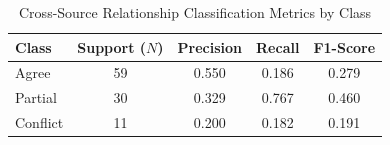 \begin{table}[htbp]
\centering
\caption{Cross-Source Relationship Classification Metrics by Class}
\label{tab:per_class_classification}
\begin{tabular}{lcccc}
\toprule
\textbf{Class} & \textbf{Support ($N$)} & \textbf{Precision} & \textbf{Recall} & \textbf{F1-Score} \\
\midrule
Agree & 59 & 0.550 & 0.186 & 0.279 \\
Partial & 30 & 0.329 & 0.767 & 0.460 \\
Conflict & 11 & 0.200 & 0.182 & 0.191 \\
\bottomrule
\end{tabular}
\end{table}
